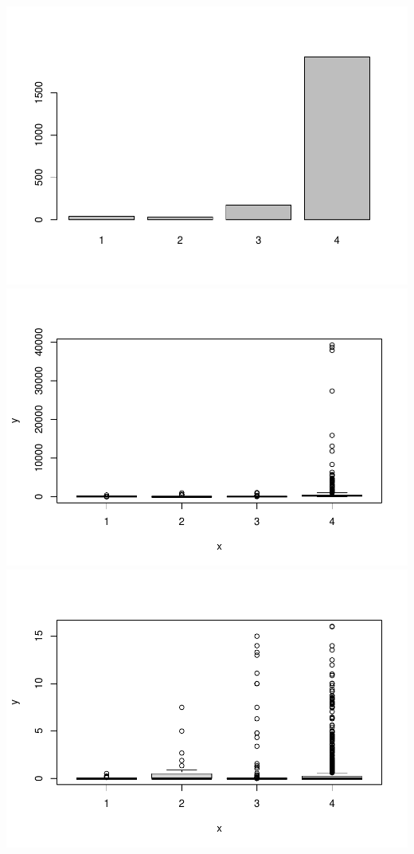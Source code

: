 \documentclass[
]{article}
\begin{document}
\includegraphics{upfsnutrient_files/figure-latex/unnamed-chunk-2-1.pdf}
\includegraphics{upfsnutrient_files/figure-latex/unnamed-chunk-2-2.pdf}
\includegraphics{upfsnutrient_files/figure-latex/unnamed-chunk-2-3.pdf}
\end{document}
